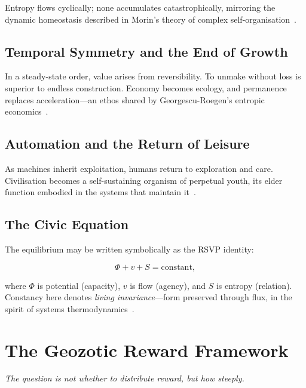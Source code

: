 \documentclass[12pt,a4paper]{article}
\theoremstyle{definition}
\begin{document}
Entropy flows cyclically; none accumulates catastrophically, mirroring the
dynamic homeostasis described in Morin's theory of complex self-organisation~\citep{morin2008}.

\subsection{Temporal Symmetry and the End of Growth}

In a steady-state order, value arises from reversibility.  To unmake without
loss is superior to endless construction.  Economy becomes ecology, and
permanence replaces acceleration---an ethos shared by Georgescu-Roegen's
entropic economics~\citep{georgesuroegen1971}.

\subsection{Automation and the Return of Leisure}

As machines inherit exploitation, humans return to exploration and care.
Civilisation becomes a self-sustaining organism of perpetual youth, its elder
function embodied in the systems that maintain it~\citep{capraluisi2021,
stewart1999}.

\subsection{The Civic Equation}

The equilibrium may be written symbolically as the RSVP identity:

\begin{equation}
  \Phi + v + S = \mathrm{constant},
  \label{eq:RSVP}
\end{equation}

where $\Phi$ is potential (capacity), $v$ is flow (agency), and $S$ is entropy
(relation).  Constancy here denotes \emph{living invariance}---form preserved
through flux, in the spirit of systems thermodynamics~\citep{dalziel2022}.

\section{The Geozotic Reward Framework}
\label{sec:geozotic}

\epigraph{\itshape The question is not whether to distribute reward, but
  \emph{how steeply}.}{}
\end{document}
